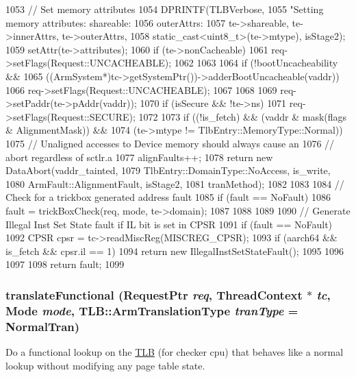 \begin{DoxyCode}
{{1053         // Set memory attributes
1054         DPRINTF(TLBVerbose,
1055                 "Setting memory attributes: shareable: %
1056                 outerAttrs: %
1057                 te->shareable, te->innerAttrs, te->outerAttrs,
1058                 static_cast<uint8_t>(te->mtype), isStage2);
1059         setAttr(te->attributes);
1060         if (te->nonCacheable) {
1061             req->setFlags(Request::UNCACHEABLE);
1062         }
1063 
1064         if (!bootUncacheability &&
1065             ((ArmSystem*)tc->getSystemPtr())->adderBootUncacheable(vaddr)) {
1066             req->setFlags(Request::UNCACHEABLE);
1067         }
1068 
1069         req->setPaddr(te->pAddr(vaddr));
1070         if (isSecure && !te->ns) {
1071             req->setFlags(Request::SECURE);
1072         }
1073         if ((!is_fetch) && (vaddr & mask(flags & AlignmentMask)) &&
1074             (te->mtype != TlbEntry::MemoryType::Normal)) {
1075                 // Unaligned accesses to Device memory should always cause an
1076                 // abort regardless of sctlr.a
1077                 alignFaults++;
1078                 return new DataAbort(vaddr_tainted,
1079                                      TlbEntry::DomainType::NoAccess, is_write,
1080                                      ArmFault::AlignmentFault, isStage2,
1081                                      tranMethod);
1082         }
1083 
1084         // Check for a trickbox generated address fault
1085         if (fault == NoFault) {
1086             fault = trickBoxCheck(req, mode, te->domain);
1087         }
1088     }
1089 
1090     // Generate Illegal Inst Set State fault if IL bit is set in CPSR
1091     if (fault == NoFault) {
1092         CPSR cpsr = tc->readMiscReg(MISCREG_CPSR);
1093         if (aarch64 && is_fetch && cpsr.il == 1) {
1094             return new IllegalInstSetStateFault();
1095         }
1096     }
1097 
1098     return fault;
1099 }
\end{DoxyCode}
\hypertarget{classArmISA_1_1TLB_ab1be1538ff47c6977f901f22ba6150a0}{
\subsubsection[{translateFunctional}]{ translateFunctional ({\bf RequestPtr} {\em req}, \/  {\bf ThreadContext} $\ast$ {\em tc}, \/  {\bf Mode} {\em mode}, \/  {\bf TLB::ArmTranslationType} {\em tranType} = {\ttfamily NormalTran})}}
\label{classArmISA_1_1TLB_ab1be1538ff47c6977f901f22ba6150a0}
Do a functional lookup on the \hyperlink{classArmISA_1_1TLB}{TLB} (for checker cpu) that behaves like a normal lookup without modifying any page table state. 


